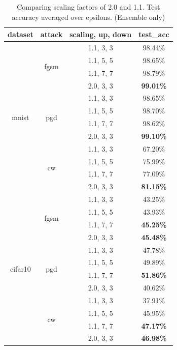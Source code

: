 \documentclass[10pt,journal,compsoc]{IEEEtran}
\begin{document}
\begin{table}[!h]
\renewcommand{\arraystretch}{1.3}
\caption{Comparing scaling factors of 2.0 and 1.1. Test accuracy averaged over epsilons. (Ensemble only)}
\label{table:scale}
\centering
\begin{tabular}{|c|c|c|c|}
\hline
dataset & attack &  scaling, up, down &  test\_acc \\
\hline\hline
\multirow{12}{*}{mnist} 
   &        \multirow{4}{*}{fgsm} &             1.1, 3, 3 &   98.44\% \\
   &         &             1.1, 5, 5 &   98.65\% \\
   &         &             1.1, 7, 7 &   98.79\% \\
   &         &             2.0, 3, 3 &   \textbf{99.01\%} \\
   \cline{2-4}
 &         \multirow{4}{*}{pgd} &             1.1, 3, 3 &   98.65\% \\
   &          &             1.1, 5, 5 &   98.70\% \\
   &          &             1.1, 7, 7 &   98.62\% \\
   &          &             2.0, 3, 3 &   \textbf{99.10\%} \\
   \cline{2-4}
&          \multirow{4}{*}{cw} &             1.1, 3, 3 &   67.20\% \\
   &           &             1.1, 5, 5 &   75.99\% \\
   &           &             1.1, 7, 7 &   77.09\% \\
   &           &             2.0, 3, 3 &   \textbf{81.15\%} \\
 \hline\hline
\multirow{12}{*}{cifar10} 
 & \multirow{4}{*}{fgsm} &             1.1, 3, 3 &   43.25\% \\
 &         &             1.1, 5, 5 &   43.93\% \\
 &         &             1.1, 7, 7 &   \textbf{45.25\%} \\
 &         &             2.0, 3, 3 &   \textbf{45.48\%} \\
 \cline{2-4}
 & \multirow{4}{*}{pgd} &             1.1, 3, 3 &   47.78\% \\
 &          &             1.1, 5, 5 &   49.89\% \\
 &          &             1.1, 7, 7 &   \textbf{51.86\%} \\
 &          &             2.0, 3, 3 &   40.62\% \\
 \cline{2-4}
 & \multirow{4}{*}{cw} &             1.1, 3, 3 &   37.91\% \\
 &           &             1.1, 5, 5 &   45.95\% \\
 &           &             1.1, 7, 7 &   \textbf{47.17\%} \\
 &           &             2.0, 3, 3 &   \textbf{46.98\%} \\
   \hline
\end{tabular}\end{table}
\end{document}
